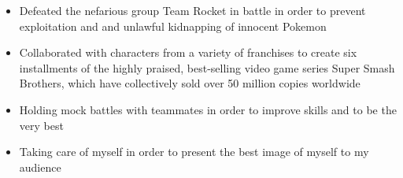\documentclass[10pt,a4paper,ragged2e]{altacv}
\begin{document}
\divider

\begin{itemize}
\item Defeated the nefarious group Team Rocket in battle in order to prevent exploitation and and unlawful kidnapping of innocent Pokemon
\end{itemize}

\divider

\begin{itemize}
\item Collaborated with characters from a variety of franchises to create six installments of the highly praised, best-selling video game series Super Smash Brothers, which have collectively sold over 50 million copies worldwide
\end{itemize}

\medskip



\begin{itemize}
    \item Holding mock battles with teammates in order to improve skills and to be the very best
\end{itemize}

\divider

\begin{itemize}
    \item Taking care of myself in order to present the best image of myself to my audience
\end{itemize}



\end{document}
